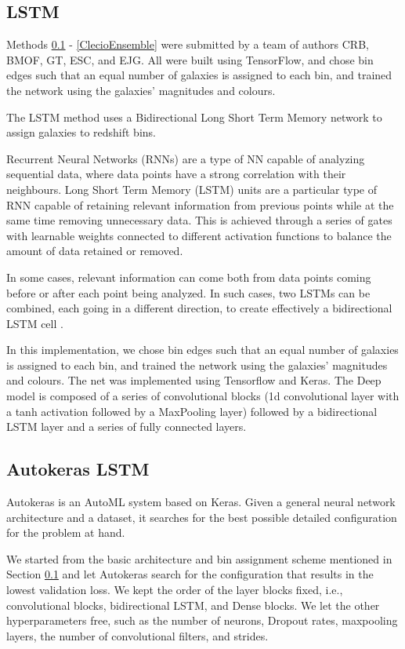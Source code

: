 \documentclass[twocolumn,twocolappendix]{aastex63}
\begin{document}
\subsection{ {\sc LSTM} } 
\label{ClecioLSTM} 
Methods \ref{ClecioLSTM} - \ref{ClecioEnsemble} were
submitted by a team of authors CRB, BMOF, GT, ESC, and EJG.  All were built using TensorFlow, and
chose bin edges such that an equal number of galaxies is assigned to each bin, and trained the
network using the galaxies' magnitudes and colours. 

The LSTM method uses a Bidirectional Long Short Term Memory network to assign galaxies to redshift
bins.
 
Recurrent Neural Networks (RNNs)\citep{schuster, medsker, pascanu} are a type of NN capable of
analyzing sequential data, where data points have a strong correlation with their neighbours. Long
Short Term Memory (LSTM) units are a particular type of RNN capable of retaining relevant
information from previous points while at the same time removing unnecessary data. This is achieved
through a series of gates with learnable weights connected to different activation functions to
balance the amount of data retained or removed.
 
In some cases, relevant information can come both from data points coming before or after each point
being analyzed. In such cases, two LSTMs can be combined, each going in a different direction, to
create effectively a bidirectional LSTM cell \citep{schuster}.
 
In this implementation, we chose bin edges such that an equal number of galaxies is assigned to each
bin, and trained the network using the galaxies' magnitudes and colours. The net was implemented
using Tensorflow and Keras. The Deep model is composed of a series of convolutional blocks (1d
convolutional layer with a tanh activation followed by a MaxPooling layer) followed by a
bidirectional LSTM layer and a series of fully connected layers. 

\subsection{ {\sc Autokeras LSTM}}
Autokeras \citep{autokeras} is an AutoML system based on Keras. Given a general neural network
architecture and a dataset, it searches for the best possible detailed configuration for the problem
at hand. 
 
We started from the basic architecture and bin assignment scheme mentioned in Section
\ref{ClecioLSTM} and let Autokeras search for the configuration that results in the lowest
validation loss. We kept the order of the layer blocks fixed, i.e., convolutional blocks,
bidirectional LSTM, and Dense blocks. We let the other hyperparameters free, such as the number of
neurons,  Dropout rates, maxpooling layers, the number of convolutional filters, and strides.
\end{document}
